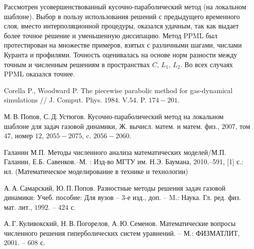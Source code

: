 \documentclass[12pt,a4paper]{article}
\begin{document}
    Рассмотрен усовершенствованный кусочно-параболический метод (на локальном шаблоне). Выбор в пользу использования решений с предыдущего временного слоя, вместо интерполяционной процедуры, оказался удачным, так как выдает более точное решение и уменьшенную диссипацию. Метод PPML был протестирован на множестве примеров, взятых с различными шагами, числами Куранта и профилями. Точность оценивалась на основе норм разности между точным и численным решениям в пространствах $ C,\, L_1,\, L_2 $. Во всех случаях PPML оказался точнее.

    \newpage

    \begin{thebibliography}{9}
  
         Corella P., Woodward P. The piecewise parabolic method for gas-dynamical simulations // J. Comput. Phys. $1984$. V.$54$. P. $174-201$.
  
         М.\,В.\,Попов, С.\,Д.\,Устюгов. Кусочно-параболический метод на локальном шаблоне для задач газовой динамики, Ж. вычисл. матем. и матем. физ., $2007$, том $47$, номер $12$, $2055-2075$, c. $2056-2060$.
  
         Галанин М.П. Методы численного анализа математических моделей/М.П. Галанин, Е.Б. Савенков.–М. : Изд-во МГТУ им. Н.Э. Баумана, 2010.–591, [1] с.: ил. (Математическое моделирование в технике и технологии)

         А.\,А.\,Самарский, Ю.\,П.\,Попов. Разностные методы решения задач газовой динамики: Учеб. пособие: Для вузов -- $3$-е изд., доп. -- M.: Наука. Гл. ред. физ. мат. лит., $1992$. -- $424$ с.

         А.\,Г.\,Куливокский, Н.\,В.\,Погорелов, А.\,Ю.\,Семенов. Математические вопросы численного решения гиперболических систем уравнений. -- М.: ФИЗМАТЛИТ, $2001$. -- $608$ с.
  
    \end{thebibliography}
\end{document}
